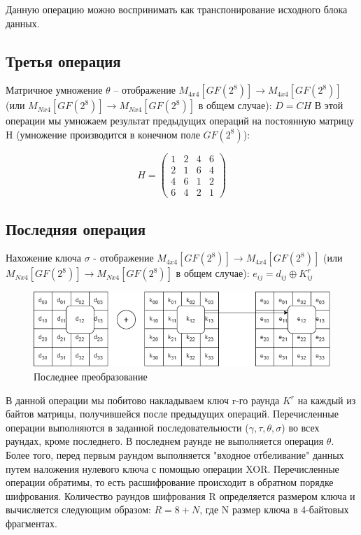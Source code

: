 \documentclass[12pt]{article}
\begin{document}
\newline
Данную операцию можно воспринимать как транспонирование исходного блока данных.

\subsection{Третья операция}
Матричное умножение $\theta$ -- отображение $M_{4x4}[GF(2^{8})] \to M_{4x4}[GF(2^{8})]$ (или $M_{Nx4}[GF(2^{8})] \to M_{Nx4}[GF(2^{8})]$ в общем случае): \newline
$D = CH$
\newline
В этой операции мы умножаем результат предыдущих операций на постоянную матрицу H (умножение производится в конечном поле $GF(2^{8})$):

\[H = \left(
    \begin{array}{cccc}
    1 & 2 & 4 & 6\\
    2 & 1 & 6 & 4\\
    4 & 6 & 1 & 2\\
    6 & 4 & 2 & 1
    \end{array}
\right)\]


\subsection{Последняя операция}
Нахожение ключа $\sigma$ - отображение $M_{4x4}[GF(2^{8})] \to M_{4x4}[GF(2^{8})]$ (или $M_{Nx4}[GF(2^{8})] \to M_{Nx4}[GF(2^{8})]$ в общем случае): \newline
$e_{ij} = d_{ij} \oplus K^{r}_{ij}$

\begin{figure}[h]
    \centering
    \includegraphics[width=0.7\linewidth]{last_func.png}
    \caption{Последнее преобразование}
    \label{fig:scheme}
\end{figure}

\newline
В данной операции мы побитово накладываем ключ r-го раунда $K^{r}$ на каждый из байтов матрицы, получившейся после предыдущих операций. 
\newline
\newline
Перечисленные операции выполняются в заданной последовательности ($\gamma, \tau, \theta, \sigma$) во всех раундах, кроме последнего. В последнем раунде не выполняется операция $\theta$. Более того, перед первым раундом выполняется "входное отбеливание" данных путем наложения нулевого ключа с помощью операции XOR. Перечисленные операции обратимы, то есть расшифрование происходит в обратном порядке шифрования.
Количество раундов шифрования R определяется размером ключа и вычисляется следующим образом: $R = 8 + N$, где N размер ключа в 4-байтовых фрагментах.
\end{document}
